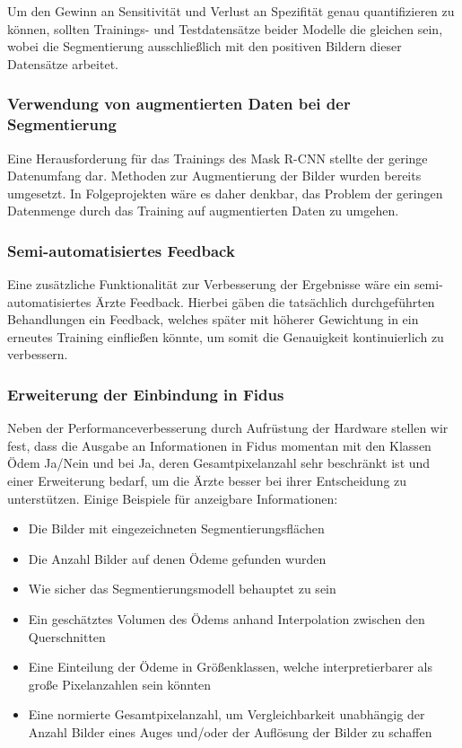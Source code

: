 Um den Gewinn an Sensitivität und Verlust an Spezifität genau quantifizieren zu können, sollten Trainings- und Testdatensätze beider Modelle die gleichen sein, wobei die Segmentierung ausschließlich mit den positiven Bildern dieser Datensätze arbeitet.

\subsubsection{Verwendung von augmentierten Daten bei der Segmentierung}
Eine Herausforderung für das Trainings des Mask R-CNN stellte der geringe Datenumfang dar. Methoden zur Augmentierung der Bilder wurden bereits umgesetzt. In Folgeprojekten wäre es daher denkbar, das Problem der geringen Datenmenge durch das Training auf augmentierten Daten zu umgehen.

\subsubsection{Semi-automatisiertes Feedback}

Eine zusätzliche Funktionalität zur Verbesserung der Ergebnisse wäre ein semi-automatisiertes Ärzte Feedback. Hierbei gäben die tatsächlich durchgeführten Behandlungen ein Feedback, welches später mit höherer Gewichtung in ein erneutes Training einfließen könnte, um somit die Genauigkeit kontinuierlich zu verbessern.  

\subsubsection{Erweiterung der Einbindung in Fidus}

Neben der Performanceverbesserung durch Aufrüstung der Hardware stellen wir fest, dass die Ausgabe an Informationen in Fidus momentan mit den Klassen Ödem Ja/Nein und bei Ja, deren Gesamtpixelanzahl sehr beschränkt ist und einer Erweiterung bedarf, um die Ärzte besser bei ihrer Entscheidung zu unterstützen. Einige Beispiele für anzeigbare Informationen:

\begin{itemize}
    \item Die Bilder mit eingezeichneten Segmentierungsflächen
    \item Die Anzahl Bilder auf denen Ödeme gefunden wurden
    \item Wie sicher das Segmentierungsmodell behauptet zu sein
    \item Ein geschätztes Volumen des Ödems anhand Interpolation zwischen den Querschnitten
    \item Eine Einteilung der Ödeme in Größenklassen, welche interpretierbarer als große Pixelanzahlen sein könnten
    \item Eine normierte Gesamtpixelanzahl, um Vergleichbarkeit unabhängig der Anzahl Bilder eines Auges und/oder der Auflösung der Bilder zu schaffen
\end{itemize}